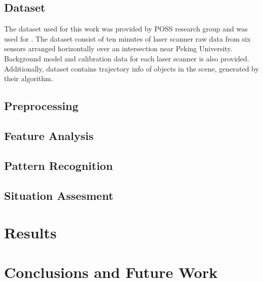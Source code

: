 \documentclass[10pt,twocolumn,letterpaper]{article}
\begin{document}
\subsection{Dataset}
 The dataset used for this work was provided by POSS research group and was used for \cite{Zhao2009}. The dataset consist of ten minutes of laser scanner raw data from six sensors arranged horizontally over an intersection near Peking University. Background model and calibration data for each laser scanner is also provided. Additionally, dataset contains trajectory info of objects in the scene, generated by their algorithm.
 
\subsection{Preprocessing}

\subsection{Feature Analysis}
\subsection{Pattern Recognition}
\subsection{Situation Assesment}

\section{Results}

\section{Conclusions and Future Work}

{\small


}
\end{document}
